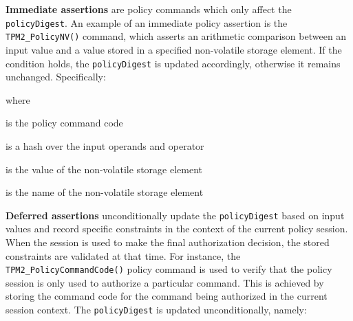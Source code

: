 \documentclass{sig-alternate-2013}
\begin{document}
\noindent\textbf{Immediate assertions} are policy commands which only affect the
\texttt{policyDigest}. An example of an immediate policy assertion is the
\texttt{TPM2\_PolicyNV()} command, which asserts an arithmetic comparison
between an input value and a value stored in a specified non-volatile storage
element. If the condition holds, the \texttt{policyDigest} is updated
accordingly, otherwise it remains unchanged. Specifically:

\vspace{\baselineskip}
\noindent
{}

\vspace{.5\baselineskip}
\noindent where

\begin{description}
  \small
  \item[$TPM\_CC\_PolicyNV$]  \hfill is the policy command code
  \item[$args$]    \hfill is a hash over the input operands and operator
  \item[$NVValue$] \hfill is the value of the non-volatile storage element
  \item[$NVName$]  \hfill is the name of the non-volatile storage element
\end{description}

\noindent\textbf{Deferred assertions} unconditionally update the
\texttt{policyDigest} based on input values and record specific constraints in
the context of the current policy session. When the session is used to make the
final authorization decision, the stored constraints are validated at that time.
For instance, the \texttt{TPM2\_PolicyCommandCode()} policy command is used to
verify that the policy session is only used to authorize a particular command.
This is achieved by storing the command code for the command being authorized in
the current session context. The \texttt{policyDigest} is updated
unconditionally, namely:

\vspace{.5\baselineskip}
\noindent
{}
\end{document}
